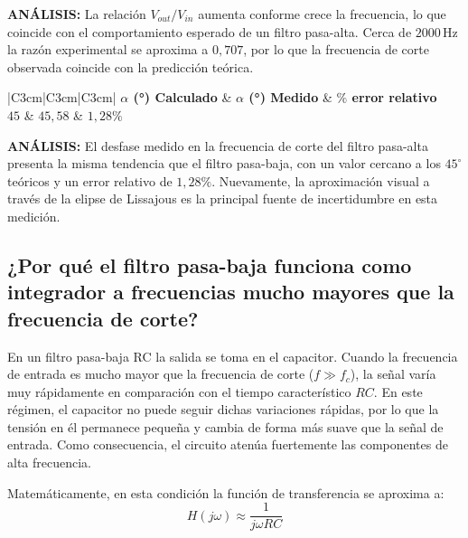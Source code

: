 \documentclass[12pt,a4paper]{article}
\begin{document}
\textbf{ANÁLISIS:} La relación $V_{out}/V_{in}$ aumenta conforme crece la frecuencia, lo que coincide con el comportamiento esperado de un filtro pasa-alta. Cerca de $2000\,\mathrm{Hz}$ la razón experimental se aproxima a $0,707$, por lo que la frecuencia de corte observada coincide con la predicción teórica.

\bigskip
\begin{table}[H]
	\centering
	\fontsize{10pt}{12pt}\selectfont
	\renewcommand{\arraystretch}{1.2}
	\setlength{\tabcolsep}{6pt}
	{\begin{tabular}{|C{3cm}|C{3cm}|C{3cm}|}
	\hline
	\textbf{$\alpha$ (°) Calculado} & \textbf{$\alpha$ (°) Medido} & \textbf{$\%$ error relativo} \\
	\hline
	$45$ & $45,58$ & $1,28\%$ \\
	\hline
	\end{tabular}}
	\caption{Desfase en la frecuencia de corte del filtro pasa-alta.}
	\label{tab:tabla-5-6}
\end{table}

\textbf{ANÁLISIS:} El desfase medido en la frecuencia de corte del filtro pasa-alta presenta la misma tendencia que el filtro pasa-baja, con un valor cercano a los $45^\circ$ teóricos y un error relativo de $1,28\%$. Nuevamente, la aproximación visual a través de la elipse de Lissajous es la principal fuente de incertidumbre en esta medición.



\subsection{¿Por qué el filtro pasa-baja funciona como integrador a frecuencias mucho mayores que la frecuencia de corte?}
En un filtro pasa-baja RC la salida se toma en el capacitor. Cuando la frecuencia de entrada es mucho mayor que la frecuencia de corte ($f \gg f_c$), la señal varía muy rápidamente en comparación con el tiempo característico $RC$. En este régimen, el capacitor no puede seguir dichas variaciones rápidas, por lo que la tensión en él permanece pequeña y cambia de forma más suave que la señal de entrada. Como consecuencia, el circuito atenúa fuertemente las componentes de alta frecuencia.

Matemáticamente, en esta condición la función de transferencia se aproxima a:
\begin{equation}
H(j\omega) \approx \frac{1}{j\omega RC}
\end{equation}
\end{document}
